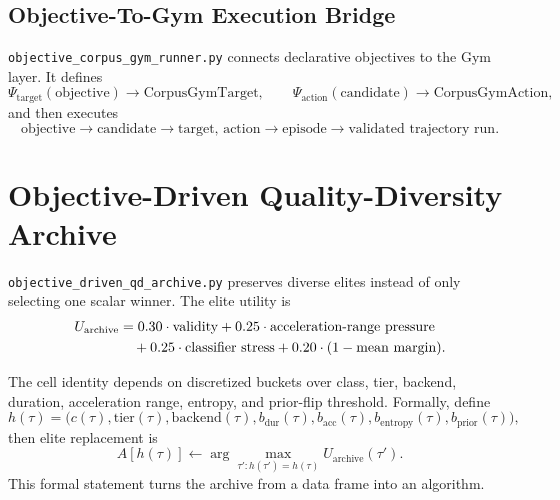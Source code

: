\documentclass[11pt]{article}
\begin{document}
\subsection*{Objective-To-Gym Execution Bridge}

\texttt{objective\_corpus\_gym\_runner.py} connects declarative objectives to
the Gym layer. It defines
\begin{equation}
    \Psi_{\text{target}}(\text{objective}) \rightarrow \text{CorpusGymTarget},
    \qquad
    \Psi_{\text{action}}(\text{candidate}) \rightarrow \text{CorpusGymAction},
\end{equation}
and then executes
\begin{equation}
    \text{objective}
    \rightarrow
    \text{candidate}
    \rightarrow
    \text{target, action}
    \rightarrow
    \text{episode}
    \rightarrow
    \text{validated trajectory run}.
\end{equation}

\section{Objective-Driven Quality-Diversity Archive}

\texttt{objective\_driven\_qd\_archive.py} preserves diverse elites instead of
only selecting one scalar winner. The elite utility is
\begin{align}
    U_{\text{archive}}
    &=
    0.30 \cdot \text{validity}
    + 0.25 \cdot \text{acceleration-range pressure} \notag \\
    &\quad
    + 0.25 \cdot \text{classifier stress}
    + 0.20 \cdot (1 - \text{mean margin}).
\end{align}

The cell identity depends on discretized buckets over class, tier, backend,
duration, acceleration range, entropy, and prior-flip threshold. Formally,
define
\begin{equation}
    h(\tau)
    =
    \big(
        c(\tau),
        \mathrm{tier}(\tau),
        \mathrm{backend}(\tau),
        b_{\mathrm{dur}}(\tau),
        b_{\mathrm{acc}}(\tau),
        b_{\mathrm{entropy}}(\tau),
        b_{\mathrm{prior}}(\tau)
    \big),
\end{equation}
then elite replacement is
\begin{equation}
    A[h(\tau)]
    \leftarrow
    \arg\max_{\tau' : h(\tau') = h(\tau)}
    U_{\text{archive}}(\tau').
\end{equation}
This formal statement turns the archive from a data frame into an algorithm.
\end{document}
